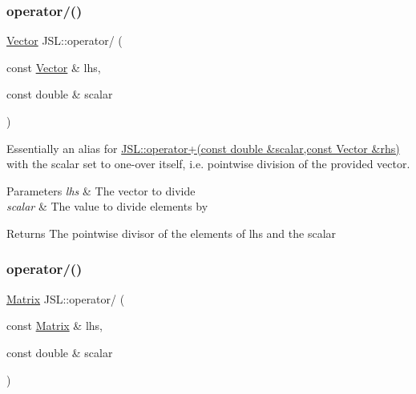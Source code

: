 \mbox{\label{namespaceJSL_a1427fd44260592b7d65d27946969fba1}} 
\subsubsection{\texorpdfstring{operator/()}{operator/()}\hspace{0.1cm}{\footnotesize\ttfamily [2/3]}}
{\footnotesize\ttfamily \hyperlink{classJSL_1_1Vector}{Vector} J\+S\+L\+::operator/ (\begin{DoxyParamCaption}\item[{const \hyperlink{classJSL_1_1Vector}{Vector} \&}]{lhs,  }\item[{const double \&}]{scalar }\end{DoxyParamCaption})\hspace{0.3cm}{\ttfamily [inline]}}



Essentially an alias for \hyperlink{namespaceJSL_ac5ceabb8b9e657c5e2d0faf9b20a36e8}{J\+S\+L\+::operator+(const double \&scalar,const Vector \&rhs)} with the scalar set to one-\/over itself, i.\+e. pointwise division of the provided vector. 


\begin{DoxyParams}{Parameters}
{\em lhs} & The vector to divide \\
\hline
{\em scalar} & The value to divide elements by \\
\hline
\end{DoxyParams}
\begin{DoxyReturn}{Returns}
The pointwise divisor of the elements of lhs and the scalar 
\end{DoxyReturn}
\mbox{\label{namespaceJSL_ab1f3153179f59c59a0c2a5e553889eb1}} 
\subsubsection{\texorpdfstring{operator/()}{operator/()}\hspace{0.1cm}{\footnotesize\ttfamily [3/3]}}
{\footnotesize\ttfamily \hyperlink{classJSL_1_1Matrix}{Matrix} J\+S\+L\+::operator/ (\begin{DoxyParamCaption}\item[{const \hyperlink{classJSL_1_1Matrix}{Matrix} \&}]{lhs,  }\item[{const double \&}]{scalar }\end{DoxyParamCaption})\hspace{0.3cm}{\ttfamily [inline]}}



